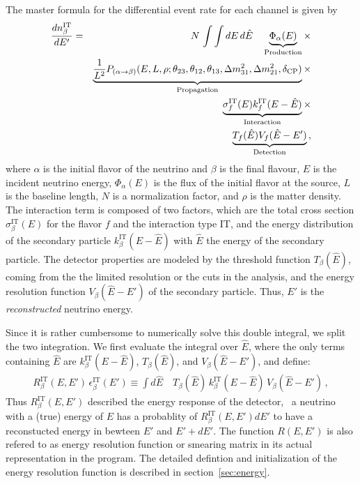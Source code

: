 The master formula for the differential event rate for each channel 
is given by
\begin{eqnarray}
\label{eq:master_event}
\frac{dn_{\beta}^{\text{IT}}}{dE'}=&&N\,\int \int dE\,d\hat{E}\quad
\underbrace{\Phi_{\alpha} (E)}_{\mathrm{Production}} \times \nonumber\\
&&\underbrace{\frac{1}{L^2} P_{(\alpha\rightarrow\beta)}(E,L,\rho;\theta_{23},
\theta_{12},\theta_{13},
\Delta m^2_{31},\Delta m^2_{21},\delta_{\mathrm{CP}})}_{\mathrm{Propagation}}
\times \nonumber \\ &&\underbrace{\sigma^{\text{IT}}_f(E)
k_f^{\text{IT}}(E-\hat{E})}_{\mathrm{Interaction}} \times \nonumber \\
&&\underbrace{ T_f(\hat{E}) V_f(\hat{E}-E')}_{\mathrm{Detection}}\,,
\end{eqnarray}
where $\alpha$ is the initial flavor of the neutrino and 
$\beta$ is the final flavour, 
$E$ is the incident neutrino energy, $\Phi_{\alpha} (E)$ is the flux of the 
initial flavor at the
source, $L$ is the baseline length, $N$ is a normalization factor, and 
$\rho$ is the matter density. The interaction term is composed of 
two factors, which are the total cross section 
$\sigma^{\text{IT}}_\beta(E)$ for the flavor $f$ and
the interaction type IT, and the energy distribution of the 
secondary particle $k_\beta^{\text{IT}}(E-\hat{E})$ with 
$\hat{E}$ the energy of the secondary particle. The detector properties are 
modeled by the threshold function $T_\beta(\hat{E})$, coming from the the 
limited resolution or the cuts in the analysis, and the energy resolution 
function $V_\beta(\hat{E}-E')$ of the secondary particle. Thus, $E'$ is the 
{\em reconstructed} neutrino energy.

Since it is rather cumbersome to numerically solve this double integral,
we split the two integration. We first evaluate the integral over
$\hat{E}$, where the only terms containing $\hat{E}$ are
$k_\beta^{\text{IT}}(E-\hat{E})$,  $ T_\beta(\hat{E})$, and 
$ V_\beta(\hat{E}-E')$, and define:
\begin{eqnarray}
\label{eq:e_res} 
R_\beta^{\text{IT}}(E,E')\,\epsilon_\beta^{\text{IT}}(E')
 \equiv
\int d\hat{E} \quad T_\beta(\hat{E})\,k_\beta^{\text{IT}}(E-\hat{E})
\,V_\beta(\hat{E}-E')\,, 
\end{eqnarray}
Thus $R_\beta^{\text{IT}}(E,E')$ described the energy response of 
the detector, \ie\ a neutrino with a (true) energy of $E$ has a probablity
of $R_\beta^{\text{IT}}(E,E') dE'$ to have a reconstucted energy 
in bewteen $E'$ and $E'+dE'$. The function $R(E,E')$ is also refered to
as energy resolution function or smearing matrix in its actual representation
in the program. The detailed
defintion and initialization of the energy resolution function is described
in section~\ref{sec:energy}.

